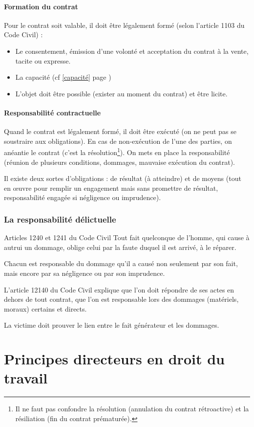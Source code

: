 \documentclass[10pt,a4paper]{article}
\begin{document}
\subsection{Formation du contrat}

Pour le contrat soit valable, il doit être légalement formé (selon l'article 1103 du Code Civil) :
\begin{itemize}
\item Le consentement, émission d'une volonté et acceptation du contrat à la vente, tacite ou expresse.
\item La capacité (cf \ref{capacité} page \pageref{capacité})
\item L'objet doit être possible (exister au moment du contrat) et être licite.
\end{itemize}

\subsection{Responsabilité contractuelle}

Quand le contrat est légalement formé, il doit être exécuté (on ne peut pas se soustraire aux obligations).
En cas de non-exécution de l'une des parties, on anéantie le contrat (c'est la résolution\footnote{Il ne faut pas confondre la résolution (annulation du contrat rétroactive) et la résiliation (fin du contrat prématurée).}).
On mets en place la responsabilité (réunion de plusieurs conditions, dommages, mauvaise exécution du contrat).

Il existe deux sortes d'obligations : de résultat (à atteindre) et de moyens (tout en œuvre pour remplir un engagement mais sans promettre de résultat, responsabilité engagée si négligence ou imprudence).

\section{La responsabilité délictuelle}

\begin{aquote}{Articles 1240 et 1241 du Code Civil}
Tout fait quelconque de l'homme, qui cause à autrui un dommage, oblige celui par la faute duquel il est arrivé, à le réparer.

Chacun est responsable du dommage qu'il a causé non seulement par son fait, mais encore par sa négligence ou par son imprudence.
\end{aquote}

L'article 12140 du Code Civil explique que l'on doit répondre de ses actes en dehors de tout contrat, que l'on est responsable lors des dommages (matériels, moraux) certains et directs.

La victime doit prouver le lien entre le fait générateur et les dommages.

\part{Principes directeurs en droit du travail}
\end{document}
